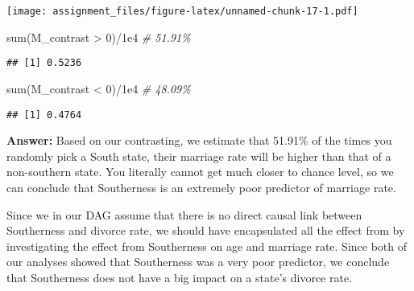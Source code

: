 \documentclass[
]{article}
\newenvironment{Shaded}{\begin{snugshade}}{\end{snugshade}}
\newcommand{\CommentTok}[1]{\textcolor[rgb]{0.56,0.35,0.01}{\textit{#1}}}
\newcommand{\DecValTok}[1]{\textcolor[rgb]{0.00,0.00,0.81}{#1}}
\newcommand{\FloatTok}[1]{\textcolor[rgb]{0.00,0.00,0.81}{#1}}
\newcommand{\FunctionTok}[1]{\textcolor[rgb]{0.00,0.00,0.00}{#1}}
\newcommand{\NormalTok}[1]{#1}
\newcommand{\OtherTok}[1]{\textcolor[rgb]{0.56,0.35,0.01}{#1}}
\newcommand{\SpecialCharTok}[1]{\textcolor[rgb]{0.00,0.00,0.00}{#1}}
\begin{document}
\begin{Shaded}
\end{Shaded}

\texttt{[image: assignment\_files/figure-latex/unnamed-chunk-17-1.pdf]}

\begin{Shaded}
\begin{Highlighting}[]
\FunctionTok{sum}\NormalTok{(M\_contrast }\SpecialCharTok{\textgreater{}} \DecValTok{0}\NormalTok{)}\SpecialCharTok{/}\FloatTok{1e4} \CommentTok{\# 51.91\%}
\end{Highlighting}
\end{Shaded}

\begin{verbatim}
## [1] 0.5236
\end{verbatim}

\begin{Shaded}
\begin{Highlighting}[]
\FunctionTok{sum}\NormalTok{(M\_contrast }\SpecialCharTok{\textless{}} \DecValTok{0}\NormalTok{)}\SpecialCharTok{/}\FloatTok{1e4} \CommentTok{\# 48.09\%}
\end{Highlighting}
\end{Shaded}

\begin{verbatim}
## [1] 0.4764
\end{verbatim}

\textbf{Answer:} Based on our contrasting, we estimate that 51.91\% of
the times you randomly pick a South state, their marriage rate will be
higher than that of a non-southern state. You literally cannot get much
closer to chance level, so we can conclude that Southerness is an
extremely poor predictor of marriage rate.

Since we in our DAG assume that there is no direct causal link between
Southerness and divorce rate, we should have encapsulated all the effect
from by investigating the effect from Southerness on age and marriage
rate. Since both of our analyses showed that Southerness was a very poor
predictor, we conclude that Southerness does not have a big impact on a
state's divorce rate.
\end{document}
